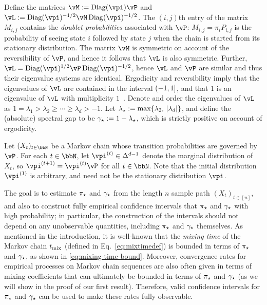 Define the matrices
$\vM := \Diag(\vpi) \vP$ and
$\vL := \Diag(\vpi)^{-1/2} \vM \Diag(\vpi)^{-1/2}$.
The $(i,j)$th entry of the matrix $M_{i,j}$ contains the \emph{doublet
probabilities} associated with $\vP$: $M_{i,j} = \pi_i P_{i,j}$ is the
probability of seeing state $i$ followed by state $j$ when the chain
is started from its stationary distribution.
The matrix $\vM$ is symmetric on account of the reversibility of
$\vP$, and hence it follows that $\vL$ is also symmetric.
Further, $\vL = \Diag(\vpi)^{1/2} \vP \Diag(\vpi)^{-1/2}$, hence $\vL$
and $\vP$ are similar and thus their eigenvalue systems are identical.
Ergodicity and reversibility imply that the eigenvalues of $\vL$ are
contained in the interval $(-1,1]$, and that $1$ is an
eigenvalue of $\vL$ with multiplicity $1$~\citep[Lemmas 12.1 and
12.2]{LePeWi08}.
Denote and order the eigenvalues of $\vL$ as
$1 = \lambda_1 > \lambda_2 \geq \dotsb \geq \lambda_d > -1$.
Let $\lambda_{\star} := \max\{ \lambda_2,\, |\lambda_d| \}$, and define the
(absolute) spectral gap to be $\gamma_{\star} := 1-\lambda_{\star}$, which is strictly
positive on account of ergodicity.

Let $(X_t)_{t\in\bbN}$ be a Markov chain whose transition
probabilities are governed by $\vP$.
For each $t \in \bbN$, let $\vpi^{(t)} \in \Delta^{d-1}$ denote the
marginal distribution of $X_t$, so
$\vpi^{(t+1)} = \vpi^{(t)} \vP$ for all $t \in \bbN$.
Note that the initial distribution $\vpi^{(1)}$ is arbitrary,
and need not be the stationary distribution $\vpi$.

The goal is to estimate $\pi_{\star}$ and $\gamma_{\star}$ from the length $n$ sample
path $(X_t)_{t \in [n]}$, and also to construct fully empirical
confidence intervals that $\pi_{\star}$ and $\gamma_{\star}$ with high probability;
in particular, the construction of the intervals should not depend on
any unobservable quantities, including $\pi_{\star}$ and $\gamma_{\star}$ themselves.
As mentioned in the introduction,
it is well-known that the \emph{mixing time} of the Markov chain
$t_{\operatorname{mix}}$ (defined in Eq.~\ref{eq:mixtimedef})
is bounded in terms of $\pi_{\star}$ and $\gamma_{\star}$, as shown in
\cref{eq:mixing-time-bound}.
Moreover, convergence rates for empirical processes on Markov chain
sequences are also often given in terms of mixing coefficients that
can ultimately be bounded in terms of $\pi_{\star}$ and
$\gamma_{\star}$ (as we will show in the proof of our first result).
Therefore, valid confidence intervals for $\pi_{\star}$ and $\gamma_{\star}$ can be
used to make these rates fully observable.

